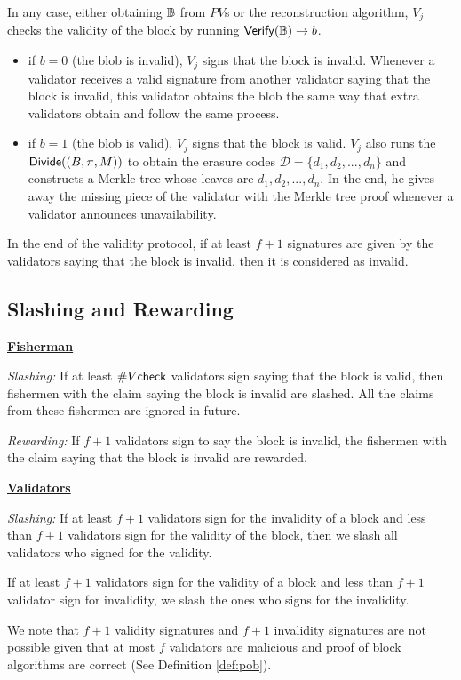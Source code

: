 In any case, either obtaining $\mathbb{B}$ from $PV$s or the reconstruction algorithm, $V_j$ checks the validity of the block by  running  $\mathsf{Verify}(\mathbb{B})\rightarrow b$.
\begin{itemize}
    \item if $b = 0$ (the blob is invalid), $V_j$ signs that the block is invalid. Whenever a validator receives a valid signature from another validator saying that the block is invalid, this validator obtains the blob  the same way that extra validators obtain and follow the same process.
    \item if $b = 1$ (the blob is valid), $V_j$ signs that the block is valid. $V_j$ also  runs the $\mathsf{Divide}((B,\pi,M))$ to obtain the erasure codes $\mathcal{D} = \{d_1,d_2,...,d_n\}$ and constructs a Merkle tree  whose leaves are $d_1,d_2,...,d_n$. In the end, he gives away the missing piece of the validator with the Merkle tree proof whenever a validator announces unavailability. 
\end{itemize}


In the end of the validity protocol, if at least $f+1$ signatures are given by the validators saying that the block is invalid, then it is considered as invalid.
\subsection{Slashing and Rewarding}

\underline{\textbf{Fisherman}} 

\emph{Slashing:} If at least $\#V\mathsf{check}$ validators sign saying that the block is valid, then fishermen with the claim saying the block is invalid are slashed. All the claims from these fishermen are ignored in future.

\emph{Rewarding:} If $f+1$ validators sign to say the block is invalid, the  fishermen with the claim saying that the block is invalid are rewarded.


\noindent\underline{\textbf{Validators}}

\emph{Slashing:} If at least $f+1$ validators sign for the invalidity of a block and less than $f+1$ validators sign for the validity of the block, then we slash all validators who signed for the validity.

If at least $f+1$ validators sign for the validity of a block and less than $f+1$ validator sign for invalidity, we slash the ones who signs for the invalidity.

We note that $f+1$ validity signatures and $f+1$ invalidity signatures are not possible given that at most $f$ validators are malicious and proof of block algorithms  are correct (See Definition \ref{def:pob}).

